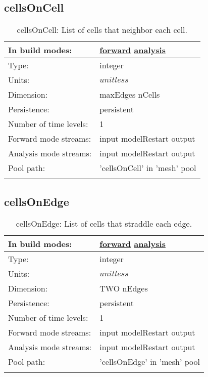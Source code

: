 \subsection[cellsOnCell]{cellsOnCell}
\label{subsec:var_sec_mesh_cellsOnCell}
\begin{center}
\begin{longtable}{| p{2.0in} | p{4.0in} |}
        \hline 
        In build modes: & \hyperref[subsec:forward_var_tab_mesh]{forward} \hyperref[subsec:analysis_var_tab_mesh]{analysis} \\
        \hline 
        Type: & integer \\
        \hline 
        Units: & $unitless$ \\
        \hline 
        Dimension: & maxEdges nCells \\
        \hline 
        Persistence: & persistent \\
        \hline 
        Number of time levels: & 1 \\
        \hline 
		 Forward mode streams: &  input modelRestart output \\
        \hline 
		 Analysis mode streams: &  input modelRestart output \\
        \hline 
            Pool path: & 'cellsOnCell' in 'mesh' pool
 \\
		 \hline 
    \caption{cellsOnCell: List of cells that neighbor each cell.}
\end{longtable}
\end{center}
\subsection[cellsOnEdge]{cellsOnEdge}
\label{subsec:var_sec_mesh_cellsOnEdge}
\begin{center}
\begin{longtable}{| p{2.0in} | p{4.0in} |}
        \hline 
        In build modes: & \hyperref[subsec:forward_var_tab_mesh]{forward} \hyperref[subsec:analysis_var_tab_mesh]{analysis} \\
        \hline 
        Type: & integer \\
        \hline 
        Units: & $unitless$ \\
        \hline 
        Dimension: & TWO nEdges \\
        \hline 
        Persistence: & persistent \\
        \hline 
        Number of time levels: & 1 \\
        \hline 
		 Forward mode streams: &  input modelRestart output \\
        \hline 
		 Analysis mode streams: &  input modelRestart output \\
        \hline 
            Pool path: & 'cellsOnEdge' in 'mesh' pool
 \\
		 \hline 
    \caption{cellsOnEdge: List of cells that straddle each edge.}
\end{longtable}
\end{center}
